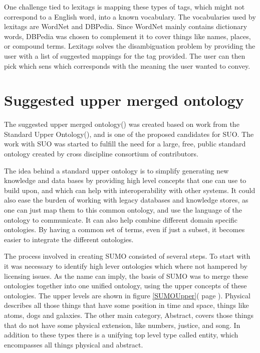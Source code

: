 One challenge tied to lexitags is mapping these types of tags,
which might not correspond to a English word, into a known vocabulary.
The vocabularies used by lexitags are WordNet and DBPedia.
Since WordNet mainly contains dictionary words,
DBPedia was chosen to complement it to cover things like names, places, or compound terms.
Lexitags solves the disambiguation problem by providing the user with a list of suggested mappings for the tag provided.
The user can then pick which sens which corresponds with the meaning the user wanted to convey\citep{Veres2011}.

\section{Suggested upper merged ontology}
The suggested upper merged ontology() was created based on work from the Standard Upper Ontology(),
and is one of the proposed candidates for SUO.
The work with SUO was started to fulfill the need for a large, free, public standard ontology
created by cross discipline consortium of contributors.

The idea behind a standard upper ontology is to simplify generating new knowledge and data bases
by providing high level concepts that one can use to build upon,
and which can help with interoperability with other systems.
It could also ease the burden of working with legacy databases and knowledge stores,
as one can just map them to this common ontology, and use the language of the ontology to communicate.
It can also help combine different domain specific ontologies.
By having a common set of terms, even if just a subset,
it becomes easier to integrate the different ontologies\citep{Niles2001}.

The process involved in creating SUMO consisted of several steps.
To start with it was necessary to identify high lever ontologies which where not hampered by licensing issues.
As the name can imply, the basis of SUMO was to merge these ontologies together into one unified ontology,
using the upper concepts of these ontologies.
The upper levels are shown in figure \ref{SUMOUpper}( page \pageref{SUMOUpper}).
Physical describes all those things that have some position in time and space, things like atoms, dogs and galaxies.
The other main category, Abstract, covers those things that do not have some physical extension, like numbers,
justice, and song.
In addition to these types there is a unifying top level type called entity, which encompasses all things physical and abstract.

